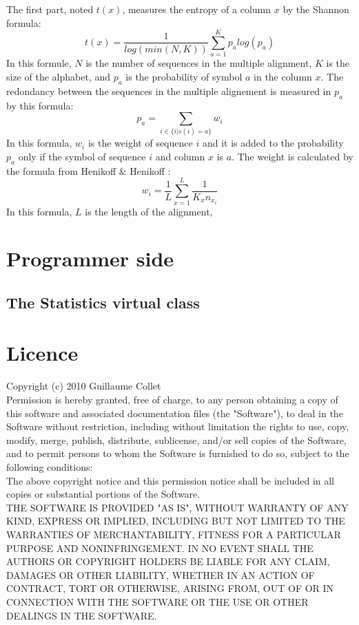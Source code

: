 \documentclass[12pt]{report}
\begin{document}
The first part, noted $t(x)$, measures the entropy of a column $x$ by the Shannon formula:
\begin{equation}
 t(x) = \frac{1}{log(min(N,K))}\sum_{a=1}^{K}p_a log(p_a)
\end{equation}
In this formule, $N$ is the number of sequences in the multiple alignment, $K$ is the size of the alphabet, and $p_a$ is the probability of symbol $a$ in the column $x$. The redondancy between the sequences in the multiple alignement is measured in $p_a$ by this formula:
\begin{equation}
	p_a = \sum_{i \in \{i|s(i) = a\}} w_i
\end{equation}
In this formula, $w_i$ is the weight of sequence $i$ and it is added to the probability $p_a$ only if the symbol of sequence $i$ and column $x$ is $a$. The weight is calculated by the formula from Henikoff \& Henikoff \cite{Henikoff-1994}:
\begin{equation}
	w_i = \frac{1}{L} \sum_{x=1}^{L}\frac{1}{K_x n_{x_i}}
\end{equation}
In this formula, $L$ is the length of the alignment, 

\newpage
\section{Programmer side}
\label{prog_sec}

\subsection{The Statistics virtual class}
\label{cla_sec}



\newpage
\section*{Licence}
Copyright (c) 2010 Guillaume Collet\\
 
Permission is hereby granted, free of charge, to any person obtaining a copy
of this software and associated documentation files (the "Software"), to deal
in the Software without restriction, including without limitation the rights
to use, copy, modify, merge, publish, distribute, sublicense, and/or sell
copies of the Software, and to permit persons to whom the Software is
furnished to do so, subject to the following conditions:\\

The above copyright notice and this permission notice shall be included in
all copies or substantial portions of the Software. \\

THE SOFTWARE IS PROVIDED "AS IS", WITHOUT WARRANTY OF ANY KIND, EXPRESS OR
IMPLIED, INCLUDING BUT NOT LIMITED TO THE WARRANTIES OF MERCHANTABILITY,
FITNESS FOR A PARTICULAR PURPOSE AND NONINFRINGEMENT. IN NO EVENT SHALL THE
AUTHORS OR COPYRIGHT HOLDERS BE LIABLE FOR ANY CLAIM, DAMAGES OR OTHER
LIABILITY, WHETHER IN AN ACTION OF CONTRACT, TORT OR OTHERWISE, ARISING FROM,
OUT OF OR IN CONNECTION WITH THE SOFTWARE OR THE USE OR OTHER DEALINGS IN
THE SOFTWARE. 
\end{document}
